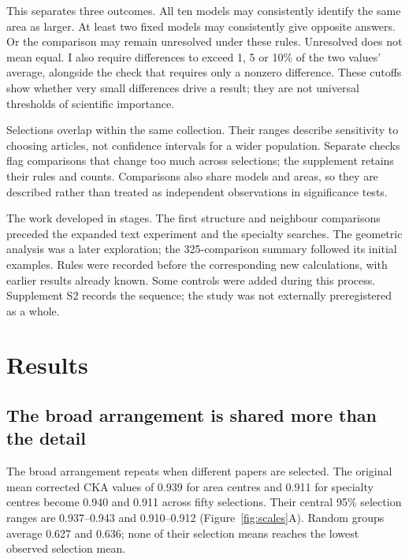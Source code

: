 \documentclass[12pt]{article}
\begin{document}
This separates three outcomes. All ten models may consistently identify the same area as larger. At least two fixed models may consistently give opposite answers. Or the comparison may remain unresolved under these rules. Unresolved does not mean equal. I also require differences to exceed 1, 5 or 10\% of the two values' average, alongside the check that requires only a nonzero difference. These cutoffs show whether very small differences drive a result; they are not universal thresholds of scientific importance.

Selections overlap within the same collection. Their ranges describe sensitivity to choosing articles, not confidence intervals for a wider population. Separate checks flag comparisons that change too much across selections; the supplement retains their rules and counts. Comparisons also share models and areas, so they are described rather than treated as independent observations in significance tests.

The work developed in stages. The first structure and neighbour comparisons preceded the expanded text experiment and the specialty searches. The geometric analysis was a later exploration; the 325-comparison summary followed its initial examples. Rules were recorded before the corresponding new calculations, with earlier results already known. Some controls were added during this process. Supplement S2 records the sequence; the study was not externally preregistered as a whole.

\section{Results}
\FloatBarrier
\subsection{The broad arrangement is shared more than the detail}
The broad arrangement repeats when different papers are selected. The original mean corrected CKA values of 0.939 for area centres and 0.911 for specialty centres become 0.940 and 0.911 across fifty selections. Their central 95\% selection ranges are 0.937--0.943 and 0.910--0.912 (Figure~\ref{fig:scales}A). Random groups average 0.627 and 0.636; none of their selection means reaches the lowest observed selection mean.
\end{document}

